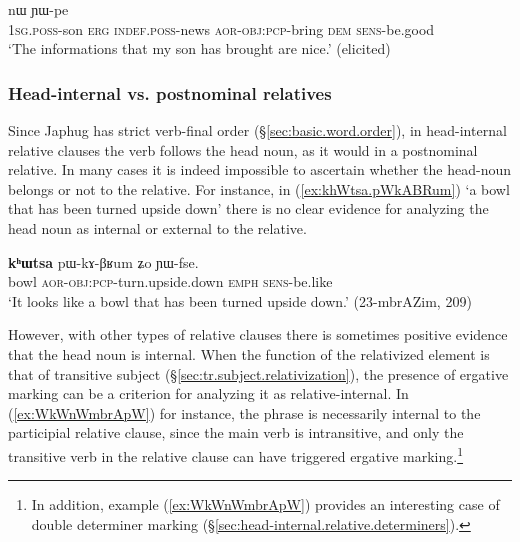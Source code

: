 \begin{exe}
\ex \label{ex:tWtCha.jAkAGWt}
 nɯ ɲɯ-pe \\
\textsc{1sg}.\textsc{poss}-son \textsc{erg} \textsc{indef}.\textsc{poss}-news \textsc{aor}-\textsc{obj}:\textsc{pcp}-bring \textsc{dem} \textsc{sens}-be.good \\
\glt `The informations that my son has brought are nice.' (elicited)
\end{exe} 
  
\subsubsection{Head-internal vs. postnominal relatives} \label{sec:head-internal.relative.postnominal}
 
Since Japhug has strict verb-final order (§\ref{sec:basic.word.order}), in head-internal relative clauses the verb follows the head noun, as it would in a postnominal relative. In many cases it is indeed impossible to ascertain whether the head-noun belongs or not to the relative. For instance, in (\ref{ex:khWtsa.pWkABRum})  `a bowl that has been turned upside down' there is no clear evidence for analyzing the head noun  as internal or external to the relative. 
  
\begin{exe}
\ex  \label{ex:khWtsa.pWkABRum}
\gll \textbf{kʰɯtsa} pɯ-kɤ-βʁum ʑo ɲɯ-fse. \\
bowl \textsc{aor}-\textsc{obj}:\textsc{pcp}-turn.upside.down \textsc{emph} \textsc{sens}-be.like \\
\glt `It looks like a bowl that has been turned upside down.' (23-mbrAZim, 209)
\end{exe} 

However,  with other types of relative clauses there is sometimes positive evidence that the head noun is internal. When the function of the relativized element is that of transitive subject (§\ref{sec:tr.subject.relativization}), the presence of ergative marking can be a criterion for analyzing it as relative-internal. In (\ref{ex:WkWnWmbrApW}) for instance, the phrase  is necessarily internal to the participial relative clause, since the main verb  is intransitive, and only the transitive verb  in the relative clause can have triggered ergative marking.\footnote{In addition, example (\ref{ex:WkWnWmbrApW}) provides an interesting case of double determiner marking (§\ref{sec:head-internal.relative.determiners}). } 
  
